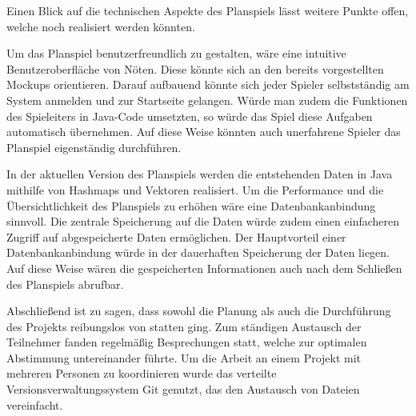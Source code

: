 Einen Blick auf die technischen Aspekte des Planspiels lässt weitere Punkte offen, welche noch realisiert werden könnten.

Um das Planspiel benutzerfreundlich zu gestalten, wäre eine intuitive Benutzeroberfläche von Nöten. Diese könnte sich
an den bereits vorgestellten Mockups orientieren. Darauf aufbauend könnte sich jeder Spieler selbstständig am System
anmelden und zur Startseite gelangen. Würde man zudem die Funktionen des Spieleiters in Java-Code umsetzten, so würde
das Spiel diese Aufgaben automatisch übernehmen. Auf diese Weise könnten auch unerfahrene Spieler das Planspiel eigenständig
durchführen.

In der aktuellen Version des Planspiels werden die entstehenden Daten in Java mithilfe von Hashmaps und Vektoren realisiert.
Um die Performance und die Übersichtlichkeit des Planspiels zu erhöhen wäre eine Datenbankanbindung sinnvoll. Die zentrale
Speicherung auf die Daten würde zudem einen einfacheren Zugriff auf abgespeicherte Daten ermöglichen. Der Hauptvorteil
einer Datenbankanbindung würde in der dauerhaften Speicherung der Daten liegen. Auf diese Weise wären die gespeicherten
Informationen auch nach dem Schließen des Planspiels abrufbar.

Abschließend ist zu sagen, dass sowohl die Planung als auch die Durchführung des Projekts reibungslos von statten ging.
Zum ständigen Austausch der Teilnehmer fanden regelmäßig Besprechungen statt, welche zur optimalen Abstimmung untereinander
führte. Um die Arbeit an einem Projekt mit mehreren Personen zu koordinieren wurde das verteilte Versionsverwaltungssystem
Git genutzt, das den Austausch von Dateien vereinfacht.

\autorende{}
